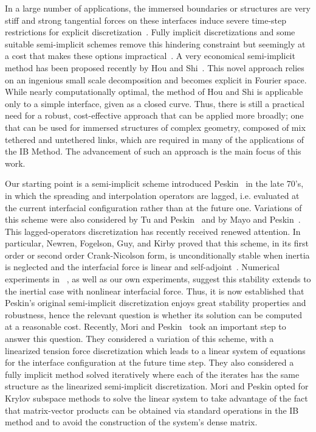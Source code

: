 \documentclass[preprint,12pt]{elsarticle}
\begin{document}
In a large number of applications, the immersed boundaries or structures are very stiff and strong tangential
forces on these interfaces induce severe time-step restrictions for explicit discretization~\cite{SW95,SW99}. Fully implicit discretizations and some suitable semi-implicit schemes remove this hindering constraint but seemingly at a cost that makes these options impractical~\cite{TP92, MP93}.  A very economical semi-implicit method has been proposed recently by Hou and Shi~\cite{HS2008a,HS2008b}. This novel approach relies on an ingenious  small scale decomposition and becomes explicit in Fourier space. While nearly computationally optimal, the method of Hou and Shi is applicable only to a simple interface, given as a closed curve. Thus, there is still a practical need for a robust, cost-effective approach that can be applied more broadly; one that can be used
for immersed structures of complex geometry, composed of mix tethered and untethered links,  which are required in many of the applications of the IB Method.  The advancement of such an approach is the main focus of this work.

Our starting point is a semi-implicit scheme introduced Peskin~\cite{Peskin77} in the late 70's, in which
the spreading and interpolation operators are lagged, i.e. evaluated at the current interfacial configuration rather than at the future one.  Variations of this scheme were also considered by Tu and Peskin~\cite{TP92} and by Mayo and Peskin~\cite{MP93}. This lagged-operators discretization has recently received renewed attention.  In particular, Newren, Fogelson, Guy, and Kirby
proved that this scheme, in its first order or second order Crank-Nicolson form, is unconditionally stable when inertia is neglected and the interfacial  force is linear and self-adjoint~\cite{NFGK2007}. Numerical experiments in ~\cite{NFGK2007}, as well as our own experiments, suggest this stability extends to the inertial case with nonlinear interfacial force. Thus, it is now established that 
Peskin's original semi-implicit discretization enjoys great stability properties and robustness, 
hence the relevant question is whether its solution  can be computed at a reasonable cost. Recently, Mori and Peskin~\cite{MP2008}  took an important step to answer this question. 
They considered a variation of this scheme, with a linearized tension force discretization which leads to a linear system of equations for the interface configuration at the future time step. They also considered a fully implicit method solved iteratively where each of the iterates has the same structure as the linearized semi-implicit discretization.  Mori and Peskin opted for Krylov subspace methods to solve the linear system to take advantage of the  fact that matrix-vector products can be obtained via standard operations in the IB method and to avoid the construction of the system's dense matrix. 
\end{document}
